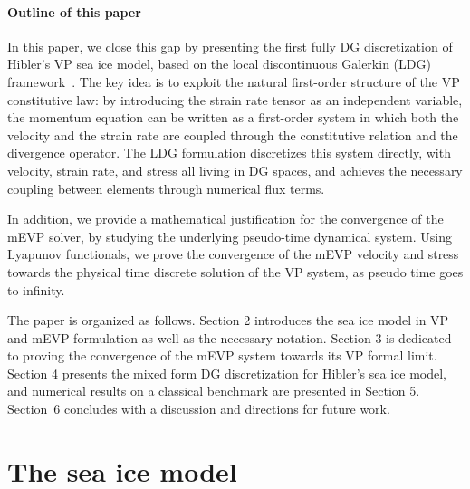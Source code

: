 \documentclass[11pt]{article}
\begin{document}
\paragraph{Outline of this paper}
In this paper, we close this gap by presenting the first fully DG discretization of Hibler's VP sea ice model, based on the local discontinuous Galerkin (LDG) framework~\cite{cockburn1998local}. The key idea is to exploit the natural first-order structure of the VP constitutive law: by introducing the strain rate tensor as an independent variable, the momentum equation can be written as a first-order system in which both the velocity and the strain rate are coupled through the constitutive relation and the divergence operator. The LDG formulation discretizes this system directly, with velocity, strain rate, and stress all living in DG spaces, and achieves the necessary coupling between elements through numerical flux terms.  

In addition, we provide a mathematical justification for the convergence of the mEVP solver, by studying the underlying pseudo-time dynamical system. Using Lyapunov functionals, we prove the convergence of the mEVP velocity and stress towards the physical time discrete solution of the VP system, as pseudo time goes to infinity.

The paper is organized as follows. Section 2 introduces the sea ice model in VP and mEVP formulation as well as the necessary notation. Section 3 is dedicated to proving the convergence of the mEVP system towards its VP formal limit. Section 4 presents the mixed form DG discretization for Hibler's sea ice model, and numerical results on a classical benchmark are presented in Section 5. Section~6 concludes with a discussion and directions for future work.






\section{The sea ice model}
\end{document}
